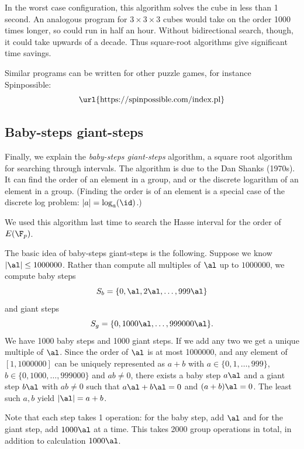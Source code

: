 In the worst case configuration, this algorithm solves the cube in less than 1 second. An analogous program for $3\times 3\times 3$ cubes would take on the order 1000 times longer, so could run in half an hour. Without bidirectional search, though, it could take upwards of a decade. Thus square-root algorithms give significant time savings.

Similar programs can be written for other puzzle games, for instance Spinpossible:
\[\text{\url{https://spinpossible.com/index.pl}}\]
\subsection{Baby-steps giant-steps}\label{sec:bsgs}
Finally, we explain the {\it baby-steps giant-steps} algorithm, a square root algorithm for searching through intervals. The algorithm is due to the Dan Shanks (1970s). It can find the order of an element in a group, and or the discrete logarithm of an element in a group. (Finding the order is of an element is a special case of the discrete log problem: $|a|=\log_a (\id)$.)

We used this algorithm last time to search the Hasse interval for the order of $E(\F_p)$.

The basic idea of baby-steps giant-steps is the following. Suppose we know $|\al|\le 1000000$. Rather than compute all multiples of $\al$ up to $1000000$, we compute baby steps 
\[S_b=\{0,\al,2\al, \ldots , 999\al\}\]
and giant steps 
\[S_g=\{0,1000\al,\ldots, 999000\al\}.\]
We have 1000 baby steps and 1000 giant steps. If we add any two we get a unique multiple of $\al$. Since the order of $\al$ is at most 1000000, and any element of $[1,1000000]$ can be uniquely represented as $a+b$ with $a\in \{0,1,\ldots, 999\}$, $b\in \{0,1000,\ldots, 999000\}$ and $ab\ne0$, there exists a baby step $a\al$ and a giant step $b\al$ with $ab\ne 0$ such that $a\al +b\al=0$ and $(a+b)\al=0$. The least such $a,b$ yield $|\al|=a+b$.

Note that each step takes 1 operation: for the baby step, add $\al$ and for the giant step, add $1000\al$ at a time. This takes 2000 group operations in total, in addition to calculation $1000\al$.

